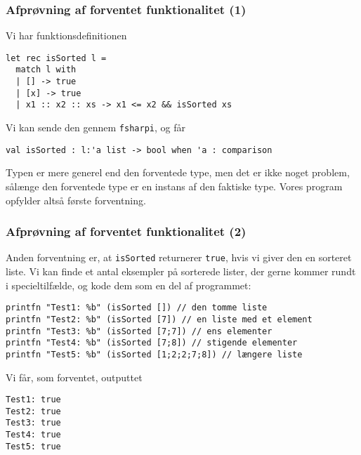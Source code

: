 \documentclass{beamer}
\begin{document}
\begin{frame}[fragile=singleslide]
\frametitle{Afprøvning af forventet funktionalitet (1)}

Vi har funktionsdefinitionen


\begin{verbatim}
let rec isSorted l =
  match l with
  | [] -> true
  | [x] -> true
  | x1 :: x2 :: xs -> x1 <= x2 && isSorted xs
\end{verbatim}

Vi kan sende den gennem \texttt{fsharpi}, og får

\begin{verbatim}
val isSorted : l:'a list -> bool when 'a : comparison
\end{verbatim}

Typen er mere generel end den forventede type, men det er ikke noget
problem, sålænge den forventede type er en instans af den faktiske
type.  Vores program opfylder altså første forventning.

\end{frame}

\begin{frame}[fragile=singleslide]
\frametitle{Afprøvning af forventet funktionalitet (2)}

Anden forventning er, at \texttt{isSorted} returnerer \texttt{true},
hvis vi giver den en sorteret liste.  Vi kan finde et antal eksempler
på sorterede lister, der gerne kommer rundt i specieltilfælde, og kode
dem som en del af programmet:

{\small
\begin{verbatim}
printfn "Test1: %b" (isSorted []) // den tomme liste
printfn "Test2: %b" (isSorted [7]) // en liste med et element
printfn "Test3: %b" (isSorted [7;7]) // ens elementer
printfn "Test4: %b" (isSorted [7;8]) // stigende elementer
printfn "Test5: %b" (isSorted [1;2;2;7;8]) // længere liste
\end{verbatim}
}

Vi får, som forventet, outputtet

{\small
\begin{verbatim}
Test1: true
Test2: true
Test3: true
Test4: true
Test5: true
\end{verbatim}
}

\end{frame}
\end{document}
